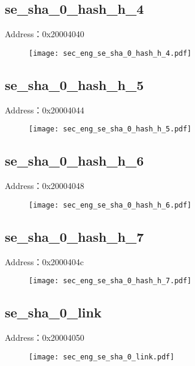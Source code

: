 \subsection{se\_sha\_0\_hash\_h\_4}
\label{sec_eng-se-sha-0-hash-h-4}
Address：0x20004040
 \begin{figure}[H]
\texttt{[image: sec\_eng\_se\_sha\_0\_hash\_h\_4.pdf]}
\end{figure}

\subsection{se\_sha\_0\_hash\_h\_5}
\label{sec_eng-se-sha-0-hash-h-5}
Address：0x20004044
 \begin{figure}[H]
\texttt{[image: sec\_eng\_se\_sha\_0\_hash\_h\_5.pdf]}
\end{figure}

\subsection{se\_sha\_0\_hash\_h\_6}
\label{sec_eng-se-sha-0-hash-h-6}
Address：0x20004048
 \begin{figure}[H]
\texttt{[image: sec\_eng\_se\_sha\_0\_hash\_h\_6.pdf]}
\end{figure}

\subsection{se\_sha\_0\_hash\_h\_7}
\label{sec_eng-se-sha-0-hash-h-7}
Address：0x2000404c
 \begin{figure}[H]
\texttt{[image: sec\_eng\_se\_sha\_0\_hash\_h\_7.pdf]}
\end{figure}

\subsection{se\_sha\_0\_link}
\label{sec_eng-se-sha-0-link}
Address：0x20004050
 \begin{figure}[H]
\texttt{[image: sec\_eng\_se\_sha\_0\_link.pdf]}
\end{figure}


